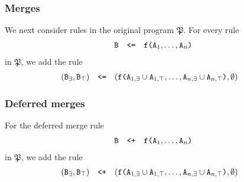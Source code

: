 \documentclass{article}
\numberwithin{equation}{section}
\renewcommand{\tt}[1]{\ifmmode\text{\texttt{#1}}\else\texttt{#1}\fi}
\begin{document}
\subsubsection{Merges}
We next consider rules in the original program $\mathfrak{P}$.
For every rule
\begin{align}
\tt{B} \quad\tt{<=}\quad \tt{f(}\tt{A}_1,\dots,\tt{A}_n\tt{)}
\end{align}
in $\mathfrak{P}$, we add the rule
\begin{align*}
(\tt{B}_\exists, \tt{B}_\top) &\quad\tt{<=}\quad (\tt{f(}\tt{A}_{1,\exists} \cup \tt{A}_{1,\top},\dots,\tt{A}_{n,\exists} \cup \tt{A}_{n,\top}\tt{)}, \emptyset)
\end{align*}

\subsubsection{Deferred merges}
For the deferred merge rule
\begin{align}
\tt{B} \quad\tt{<+}\quad \tt{f(}\tt{A}_1,\dots,\tt{A}_n\tt{)}
\end{align}
in $\mathfrak{P}$, we add the rule
\begin{align*}
(\tt{B}_\exists, \tt{B}_\top) &\quad\tt{<+}\quad (\tt{f(}\tt{A}_{1,\exists} \cup \tt{A}_{1,\top},\dots,\tt{A}_{n,\exists} \cup \tt{A}_{n,\top}\tt{)}, \emptyset)
\end{align*}
\end{document}

